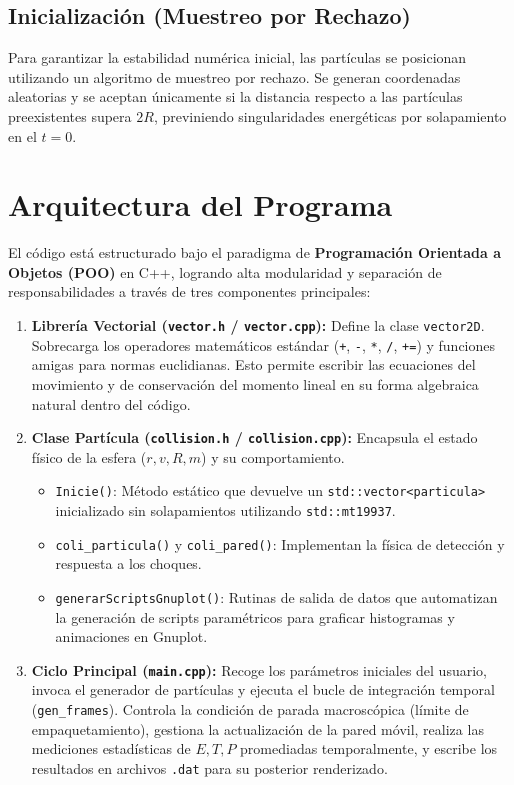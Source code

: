 \documentclass[12pt,a4paper]{article}
\begin{document}
\subsection*{Inicialización (Muestreo por Rechazo)}
Para garantizar la estabilidad numérica inicial, las partículas se posicionan utilizando un algoritmo de muestreo por rechazo. Se generan coordenadas aleatorias y se aceptan únicamente si la distancia respecto a las partículas preexistentes supera $2R$, previniendo singularidades energéticas por solapamiento en el $t=0$.

\section{Arquitectura del Programa}
El código está estructurado bajo el paradigma de \textbf{Programación Orientada a Objetos (POO)} en C++, logrando alta modularidad y separación de responsabilidades a través de tres componentes principales:

\begin{enumerate}[label=\textbf{\arabic*.}]
    \item \textbf{Librería Vectorial (\texttt{vector.h} / \texttt{vector.cpp}):}
    Define la clase \texttt{vector2D}. Sobrecarga los operadores matemáticos estándar (\texttt{+}, \texttt{-}, \texttt{*}, \texttt{/}, \texttt{+=}) y funciones amigas para normas euclidianas. Esto permite escribir las ecuaciones del movimiento y de conservación del momento lineal en su forma algebraica natural dentro del código.

    \item \textbf{Clase Partícula (\texttt{collision.h} / \texttt{collision.cpp}):}
    Encapsula el estado físico de la esfera ($r, v, R, m$) y su comportamiento. 
    \begin{itemize}
        \item \texttt{Inicie()}: Método estático que devuelve un \texttt{std::vector<particula>} inicializado sin solapamientos utilizando \texttt{std::mt19937}.
        \item \texttt{coli\_particula()} y \texttt{coli\_pared()}: Implementan la física de detección y respuesta a los choques.
        \item \texttt{generarScriptsGnuplot()}: Rutinas de salida de datos que automatizan la generación de scripts paramétricos para graficar histogramas y animaciones en Gnuplot.
    \end{itemize}

    \item \textbf{Ciclo Principal (\texttt{main.cpp}):}
    Recoge los parámetros iniciales del usuario, invoca el generador de partículas y ejecuta el bucle de integración temporal (\texttt{gen\_frames}). Controla la condición de parada macroscópica (límite de empaquetamiento), gestiona la actualización de la pared móvil, realiza las mediciones estadísticas de $E, T, P$ promediadas temporalmente, y escribe los resultados en archivos \texttt{.dat} para su posterior renderizado.
\end{enumerate}
\end{document}

